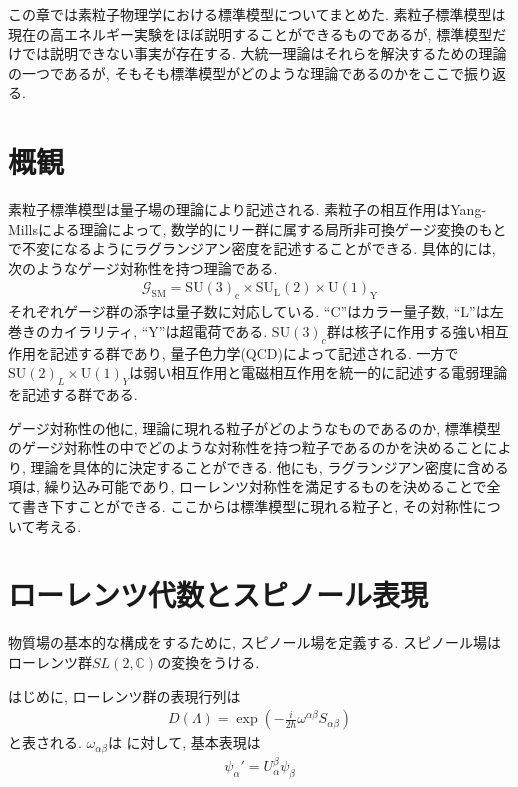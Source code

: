 %
%
この章では素粒子物理学における標準模型についてまとめた.
素粒子標準模型は現在の高エネルギー実験をほぼ説明することができるものであるが, 標準模型だけでは説明できない事実が存在する.
大統一理論はそれらを解決するための理論の一つであるが, そもそも標準模型がどのような理論であるのかをここで振り返る.
\section{概観}
素粒子標準模型は量子場の理論により記述される.
素粒子の相互作用はYang-Millsによる理論によって, 数学的にリー群に属する局所非可換ゲージ変換のもとで不変になるようにラグランジアン密度を記述することができる.
具体的には, 次のようなゲージ対称性を持つ理論である.
\begin{align}
  \mathcal{G}_{\text{SM}}=\mathrm{SU}(3)_\mathrm{c}\times \mathrm{SU}_\mathrm{L}(2)\times \mathrm{U}(1)_\mathrm{Y}\label{SM-Gauge}
\end{align}
それぞれゲージ群の添字は量子数に対応している.
``C''はカラー量子数, ``L''は左巻きのカイラリティ, ``Y''は超電荷である.
$\mathrm{SU}(3)_c$群は核子に作用する強い相互作用を記述する群であり, 量子色力学(QCD)によって記述される.\cite{grossUltravioletBehaviorNonAbelian1973,politzerReliablePerturbativeResults1973a,weinbergNonAbelianGaugeTheories1973}
一方で$\mathrm{SU}(2)_L\times \mathrm{U}(1)_Y$は弱い相互作用と電磁相互作用を統一的に記述する電弱理論を記述する群である.
\cite{glashowPartialsymmetriesWeakInteractions1961,salamWeakElectromagneticInteractions1968,weinbergModelLeptons1967}

ゲージ対称性の他に, 理論に現れる粒子がどのようなものであるのか, 標準模型のゲージ対称性の中でどのような対称性を持つ粒子であるのかを決めることにより, 理論を具体的に決定することができる.
他にも, ラグランジアン密度に含める項は, 繰り込み可能であり, ローレンツ対称性を満足するものを決めることで全て書き下すことができる.
ここからは標準模型に現れる粒子と, その対称性について考える.
\section{ローレンツ代数とスピノール表現}
物質場の基本的な構成をするために, スピノール場を定義する.
スピノール場はローレンツ群$SL(2,\mathbb{C})$の変換をうける.

はじめに, ローレンツ群の表現行列は
\begin{eqnarray}
  D(\Lambda) = \exp\left(-\frac{i}{2\hbar}\omega^{\alpha\beta}S_{\alpha\beta}\right)
\end{eqnarray}
と表される.
$\omega_{\alpha\beta}$は
に対して, 基本表現は
\begin{eqnarray}
  \psi_\alpha' = U_\alpha^\beta \psi_\beta\label{spi_1}
\end{eqnarray}

